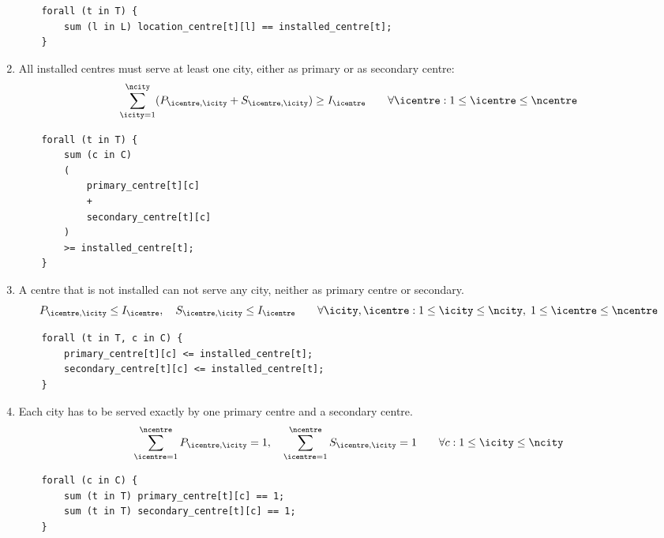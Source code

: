 \begin{enumerate}
    \begin{lstlisting}
    forall (t in T) {
    	sum (l in L) location_centre[t][l] == installed_centre[t];
    }
    \end{lstlisting}

    \item All installed centres must serve at least one city, either as primary or as secondary
    centre:
    \begin{equation}
    \sum_{\icity = 1}^{\ncity} (P_{\icentre, \icity} + S_{\icentre, \icity}) \ge I_{\icentre}
    \qquad \forall \icentre: 1 \le \icentre \le \ncentre
    \label{cstr:inst-centres-must-serve}
    \end{equation}
    
    \begin{lstlisting}
    forall (t in T) {
    	sum (c in C)
    	(
    	    primary_centre[t][c]
    	    +
    	    secondary_centre[t][c]
    	)
    	>= installed_centre[t];
    }
    \end{lstlisting}

    \item A centre that is not installed can not serve any city, neither as primary centre or
    secondary.
    \begin{equation}
    P_{\icentre, \icity} \le I_\icentre,
    \quad
    S_{\icentre, \icity} \le I_\icentre
    \qquad \forall \icity, \icentre:
    1 \le \icity \le \ncity,\;
    1 \le \icentre \le \ncentre
    \label{cstr:not-installed-not-prim-sec}
    \end{equation}
    
    \begin{lstlisting}
    forall (t in T, c in C) {
    	primary_centre[t][c] <= installed_centre[t];
    	secondary_centre[t][c] <= installed_centre[t];
    }
    \end{lstlisting}

    \item Each city has to be served exactly by one primary centre and a secondary centre.
    \begin{equation}
    \sum_{\icentre = 1}^{\ncentre} P_{\icentre, \icity} = 1,
    \quad
    \sum_{\icentre = 1}^{\ncentre} S_{\icentre, \icity} = 1
    \qquad \forall c: 1 \le \icity \le \ncity
    \label{cstr:all-cities-served}
    \end{equation}
    
    \begin{lstlisting}
    forall (c in C) {
    	sum (t in T) primary_centre[t][c] == 1;
    	sum (t in T) secondary_centre[t][c] == 1;
    }
    \end{lstlisting}


\end{enumerate}
